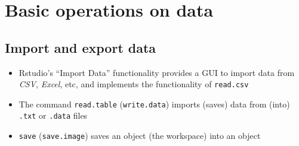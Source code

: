 \documentclass[]{article}
\newenvironment{Shaded}{\begin{snugshade}}{\end{snugshade}}
\newcommand{\KeywordTok}[1]{\textcolor[rgb]{0.13,0.29,0.53}{\textbf{{#1}}}}
\newcommand{\DecValTok}[1]{\textcolor[rgb]{0.00,0.00,0.81}{{#1}}}
\newcommand{\StringTok}[1]{\textcolor[rgb]{0.31,0.60,0.02}{{#1}}}
\newcommand{\CommentTok}[1]{\textcolor[rgb]{0.56,0.35,0.01}{\textit{{#1}}}}
\newcommand{\ErrorTok}[1]{\textcolor[rgb]{0.64,0.00,0.00}{\textbf{{#1}}}}
\newcommand{\NormalTok}[1]{{#1}}
\providecommand{\tightlist}{%
  \setlength{\itemsep}{0pt}\setlength{\parskip}{0pt}}
\begin{document}
\begin{Shaded}
\end{Shaded}

\section{Basic operations on data}\label{basic-operations-on-data}

\subsection{Import and export data}\label{import-and-export-data}

\begin{itemize}
\tightlist
\item
  Rstudio's ``Import Data'' functionality provides a GUI to import data
  from \emph{CSV}, \emph{Excel}, etc, and implements the functionality
  of \texttt{read.csv}
\item
  The command \texttt{read.table} (\texttt{write.data}) imports (saves)
  data from (into) \texttt{.txt} or \texttt{.data} files
\item
  \texttt{save} (\texttt{save.image}) saves an object (the workspace)
  into an object
\end{itemize}
\end{document}
